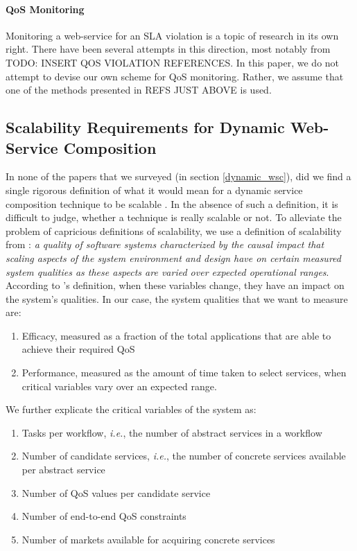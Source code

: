 \documentclass[10pt,journal,compsoc]{IEEEtran}
\begin{document}
\paragraph{QoS Monitoring} Monitoring a web-service for an SLA violation is a topic of research in its own right. There have been several attempts in this direction, most notably from {TODO: INSERT QOS VIOLATION REFERENCES}. In this paper, we do not attempt to devise our own scheme for QoS monitoring. Rather, we assume that one of the methods presented in {REFS JUST ABOVE} is used. 

\subsection{Scalability Requirements for Dynamic Web-Service Composition}
In none of the papers that we surveyed (in section \ref{dynamic_wsc}), did we find a single rigorous definition of what it would mean for a dynamic service composition technique to be scalable . In the absence of such a definition, it is difficult to judge, whether a technique is really scalable or not. To alleviate the problem of capricious definitions of scalability, we use a definition of scalability from \cite{Duboc2007}: \textit{a quality of software systems characterized by the causal impact that scaling aspects of the system environment and design have on certain measured system qualities as these aspects are varied over expected operational ranges}.\\
According to \cite{Duboc2007}'s definition, when these variables change, they have an impact on the system's qualities. In our case, the system qualities that we want to measure are:
	\begin{enumerate}
		\item Efficacy, measured as a fraction of the total applications that are able to achieve their required QoS
		\item Performance, measured as the amount of time taken to select services, when critical variables vary over an expected range.
	\end{enumerate}	 
	
We further explicate the critical variables of the system as:
	\begin{enumerate}
		\item Tasks per workflow, \textit{i.e.}, the number of abstract services in a workflow
		\item Number of candidate services, \textit{i.e.}, the number of concrete services available per abstract service
		\item Number of QoS values per candidate service
		\item Number of end-to-end QoS constraints
		\item Number of markets available for acquiring concrete services
	\end{enumerate}
	
\end{document}
